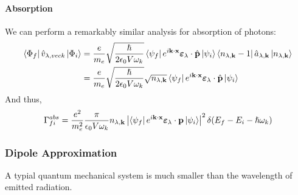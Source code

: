 \documentclass[a4paper]{article}
\begin{document}
\paragraph{Absorption}
We can perform a remarkably similar analysis for absorption of photons:
\begin{align*}
	\left\langle \Phi_f \right\rvert \hat{v}_{\lambda,vec{k}} \left\lvert \Phi_i\right\rangle &=
		\frac{e}{m_e} \sqrt{\frac{\hslash}{2\epsilon_0V\omega_k}}
		\left\langle \psi_f \right\rvert e^{i\boldsymbol{\mathbf{k}}\cdot\boldsymbol{\mathbf{x}}}
		\boldsymbol{\mathbf{\varepsilon}}_\lambda \cdot \hat{\boldsymbol{\mathbf{p}}}
		\left\lvert \psi_i\right\rangle \left\langle n_{\lambda,\boldsymbol{\mathbf{k}}}-1 \right\rvert
		\hat{a}_{\lambda,\boldsymbol{\mathbf{k}}}\left\lvert n_{\lambda,\boldsymbol{\mathbf{k}}}\right\rangle\\
	&= \frac{e}{m_e}\sqrt{\frac{\hslash}{2\epsilon_0V\omega_k}}
		\sqrt{n_{\lambda,\boldsymbol{\mathbf{k}}}}
		\left\langle \psi_f \right\rvert e^{i\boldsymbol{\mathbf{k}}\cdot\boldsymbol{\mathbf{x}}}
		\boldsymbol{\mathbf{\varepsilon}}_\lambda\cdot\hat{\boldsymbol{\mathbf{p}}}
		\left\lvert \psi_i\right\rangle\\
\end{align*}
And thus,
\[
	\Gamma_{fi}^{abs} = \frac{e^2}{m_e^2} \frac{\pi}{\epsilon_0V\omega_k}
		n_{\lambda,\boldsymbol{\mathbf{k}}}
		\left\lvert 
			\left\langle \psi_f \right\rvert e^{i\boldsymbol{\mathbf{k}} \cdot \boldsymbol{\mathbf{x}}}
			\boldsymbol{\mathbf{\varepsilon}}_\lambda \cdot \boldsymbol{\mathbf{p}} \left\lvert \psi_i\right\rangle
		\right\rvert^2 \delta(E_f - E_i - \hslash\omega_k)
\]

\subsubsection{Dipole Approximation}
\label{hw3:e}
A typial quantum mechanical system is much smaller than the wavelength of
emitted radiation.
\end{document}
